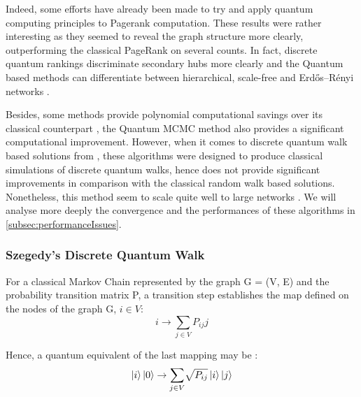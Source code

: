 \documentclass{article}
\begin{document}
Indeed, some efforts \cite{paparo_2014, paparo_müller_comellas_martin-delgado_2013, sánchez-burillo_duch_gómez-gardeñes_zueco_2012, loke_tang_rodriguez_small_wang_2016, garnerone_zanardi_lidar_2012, paparo_martin-delgado_2012} have already been made to try and apply quantum computing principles to Pagerank computation. These results were rather interesting as they seemed to reveal the graph structure more clearly, outperforming the classical PageRank on several counts. In fact, discrete quantum rankings discriminate secondary hubs more clearly and the Quantum based methods can differentiate between hierarchical, scale-free and Erdős–Rényi networks \cite{paparo_2014, paparo_müller_comellas_martin-delgado_2013, loke_tang_rodriguez_small_wang_2016}.

Besides, some methods provide polynomial computational savings over its classical counterpart \cite{garnerone_zanardi_lidar_2012}, the Quantum MCMC method also provides a significant computational improvement. However, when it comes to discrete quantum walk based solutions from \cite{paparo_2014, paparo_müller_comellas_martin-delgado_2013, paparo_martin-delgado_2012}, these algorithms were designed to produce classical simulations of discrete quantum walks, hence does not provide significant improvements in comparison with the classical random walk based solutions. Nonetheless, this method seem to scale quite well to large networks \cite{loke_tang_rodriguez_small_wang_2016}. We will analyse more deeply the convergence and the performances of these algorithms in \ref{subsec:performanceIssues}.

\subsubsection{Szegedy's Discrete Quantum Walk}
\label{subsubsec:szegedy_discrete_quantum_walk}

For a classical Markov Chain represented by the graph G = (V, E) and the probability transition matrix P, a transition step establishes the map defined on the nodes of the graph G, $i\in V$: 
\begin{equation*}
    i \rightarrow \underset{j \in V}{\sum} P_{ij} j
\end{equation*}

Hence, a quantum equivalent of the last mapping may be :
\begin{equation*}
    \ket{i}\ket{0} \rightarrow \underset{j \in V}{\sum} \sqrt{P_{ij}} \ket{i} \ket{j}
\end{equation*}
\end{document}
